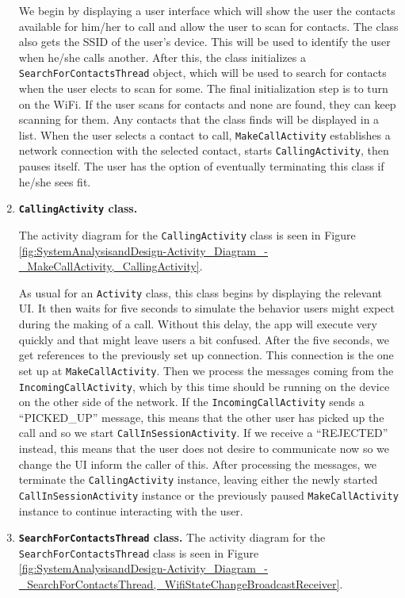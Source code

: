 \documentclass[12pt,svgnames,smaller]{article} %
\begin{document}
\begin{enumerate}
		We begin by displaying a user interface which will show the user the contacts available for him/her to call and allow the user to scan for contacts. The class also gets the SSID of the user's device. This will be used to identify the user when he/she calls another. After this, the class initializes a \texttt{SearchForContactsThread} object, which will be used to search for contacts when the user elects to scan for some. The final initialization step is to turn on the WiFi. If the user scans for contacts and none are found, they can keep scanning for them. Any contacts that the class finds will be displayed in a list. When the user selects a contact to call, \texttt{MakeCallActivity} establishes a network connection with the selected contact, starts \texttt{CallingActivity}, then pauses itself. The user has the option of eventually terminating this class if he/she sees fit.
		
		\item \textbf{\texttt{CallingActivity} class.} 
		
		The activity diagram for the \texttt{CallingActivity} class is seen in Figure \ref{fig:SystemAnalysisandDesign-Activity_Diagram_-_MakeCallActivity,_CallingActivity}.
		
		As usual for an \texttt{Activity} class, this class begins by displaying the relevant UI. It then waits for five seconds to simulate the behavior users might expect during the making of a call. Without this delay, the app will execute very quickly and that might leave users a bit confused. After the five seconds, we get references to the previously set up connection. This connection is the one set up at \texttt{MakeCallActivity}. Then we process the messages coming from the \texttt{IncomingCallActivity}, which by this time should be running on the device on the other side of the network. If the \texttt{IncomingCallActivity} sends a “PICKED\_UP” message, this means that the other user has picked up the call and so we start \texttt{CallInSessionActivity}. If we receive a “REJECTED” instead, this means that the user does not desire to communicate now so we change the UI inform the caller of this. After processing the messages, we terminate the \texttt{CallingActivity} instance, leaving either the newly started \texttt{CallInSessionActivity} instance or the previously paused \texttt{MakeCallActivity} instance to continue interacting with the user.
		
		\item \textbf{\texttt{SearchForContactsThread} class.} 
		The activity diagram for the \texttt{SearchForContactsThread} class is seen in Figure \ref{fig:SystemAnalysisandDesign-Activity_Diagram_-_SearchForContactsThread,_WifiStateChangeBroadcastReceiver}.
		

\end{enumerate}
\end{document}

